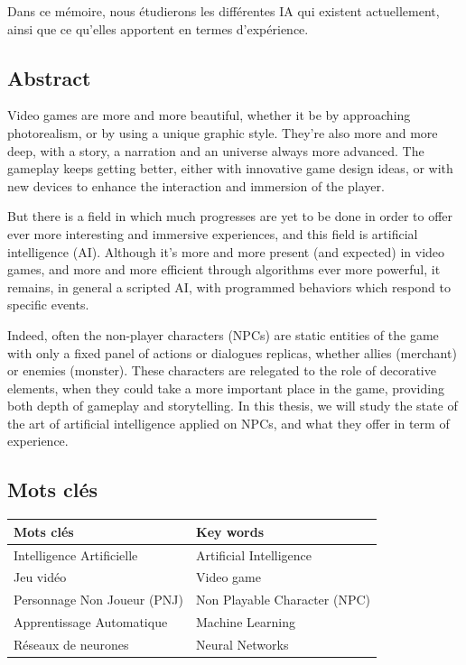 \documentclass[a4paper, 12pt]{article} %
\begin{document}
Dans ce mémoire, nous étudierons les différentes IA qui existent actuellement, ainsi que ce qu’elles apportent en termes d'expérience.

\newpage
\subsection{Abstract}
Video games are more and more beautiful, whether it be by approaching photorealism, or by using a unique graphic style. They’re also more and more deep, with a story, a narration and an universe always more advanced. The gameplay keeps getting better, either with innovative game design ideas, or with new devices to enhance the interaction and immersion of the player.
 
But there is a field in which much progresses are yet to be done in order to offer ever more interesting and immersive experiences, and this field is artificial intelligence (AI). Although it’s more and more present (and expected) in video games, and more and more efficient through algorithms ever more powerful, it remains, in general a scripted AI, with programmed behaviors which respond to specific events. 

Indeed, often the non-player characters (NPCs) are static entities of the game with only a fixed panel of actions or dialogues replicas, whether allies (merchant) or enemies (monster). These characters are relegated to the role of decorative elements, when they could take a more important place in the game, providing both depth of gameplay and storytelling.
In this thesis, we will study the state of the art of artificial intelligence applied on NPCs, and what they offer in term of experience.

\newpage
\subsection{Mots clés}
\begin{center}
	\begin{tabular}{|p{}|p{}|}
		\hline
		Mots clés & Key words\\
		\hline		
		Intelligence Artificielle&Artificial Intelligence\\
		Jeu vidéo&Video game\\
		Personnage Non Joueur (PNJ)&Non Playable Character (NPC)\\
		Apprentissage Automatique&Machine Learning\\
		Réseaux de neurones&Neural Networks\\
		\hline
	\end{tabular}
\end{center}
\end{document}
